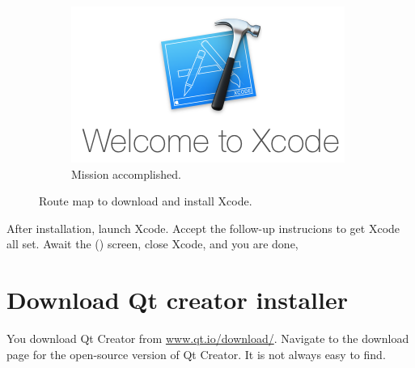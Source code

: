 \begin{figure}
\begin{subfigure}{.5\textwidth}
  \centering
  \includegraphics[width=.9\textwidth]{graphics/xcode-setup-4.png}
  \caption{Mission accomplished.}
\end{subfigure}
\caption{Route map to download and install Xcode.}
\label{fig:xcode}
\end{figure}

After installation, launch Xcode. Accept the follow-up instrucions to get Xcode all set. Await the  () screen, close Xcode, and you are done,

\section{Download Qt creator installer}
You download Qt Creator from \url{www.qt.io/download/}. Navigate to the download page for the open-source version of Qt Creator. It is not always easy to find.

